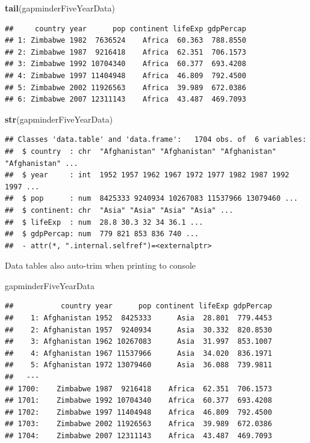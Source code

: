 \documentclass[]{article}
\newenvironment{Shaded}{\begin{snugshade}}{\end{snugshade}}
\newcommand{\KeywordTok}[1]{\textcolor[rgb]{0.13,0.29,0.53}{\textbf{{#1}}}}
\newcommand{\NormalTok}[1]{{#1}}
\begin{document}
\begin{Shaded}
\begin{Highlighting}[]
\KeywordTok{tail}\NormalTok{(gapminderFiveYearData)}
\end{Highlighting}
\end{Shaded}

\begin{verbatim}
##     country year      pop continent lifeExp gdpPercap
## 1: Zimbabwe 1982  7636524    Africa  60.363  788.8550
## 2: Zimbabwe 1987  9216418    Africa  62.351  706.1573
## 3: Zimbabwe 1992 10704340    Africa  60.377  693.4208
## 4: Zimbabwe 1997 11404948    Africa  46.809  792.4500
## 5: Zimbabwe 2002 11926563    Africa  39.989  672.0386
## 6: Zimbabwe 2007 12311143    Africa  43.487  469.7093
\end{verbatim}

\begin{Shaded}
\begin{Highlighting}[]
\KeywordTok{str}\NormalTok{(gapminderFiveYearData)}
\end{Highlighting}
\end{Shaded}

\begin{verbatim}
## Classes 'data.table' and 'data.frame':   1704 obs. of  6 variables:
##  $ country  : chr  "Afghanistan" "Afghanistan" "Afghanistan" "Afghanistan" ...
##  $ year     : int  1952 1957 1962 1967 1972 1977 1982 1987 1992 1997 ...
##  $ pop      : num  8425333 9240934 10267083 11537966 13079460 ...
##  $ continent: chr  "Asia" "Asia" "Asia" "Asia" ...
##  $ lifeExp  : num  28.8 30.3 32 34 36.1 ...
##  $ gdpPercap: num  779 821 853 836 740 ...
##  - attr(*, ".internal.selfref")=<externalptr>
\end{verbatim}

Data tables also auto-trim when printing to console

\begin{Shaded}
\begin{Highlighting}[]
\NormalTok{gapminderFiveYearData}
\end{Highlighting}
\end{Shaded}

\begin{verbatim}
##           country year      pop continent lifeExp gdpPercap
##    1: Afghanistan 1952  8425333      Asia  28.801  779.4453
##    2: Afghanistan 1957  9240934      Asia  30.332  820.8530
##    3: Afghanistan 1962 10267083      Asia  31.997  853.1007
##    4: Afghanistan 1967 11537966      Asia  34.020  836.1971
##    5: Afghanistan 1972 13079460      Asia  36.088  739.9811
##   ---                                                      
## 1700:    Zimbabwe 1987  9216418    Africa  62.351  706.1573
## 1701:    Zimbabwe 1992 10704340    Africa  60.377  693.4208
## 1702:    Zimbabwe 1997 11404948    Africa  46.809  792.4500
## 1703:    Zimbabwe 2002 11926563    Africa  39.989  672.0386
## 1704:    Zimbabwe 2007 12311143    Africa  43.487  469.7093
\end{verbatim}
\end{document}
